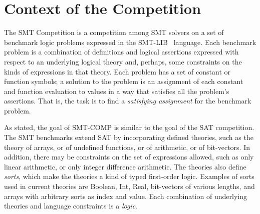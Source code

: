\documentclass[twoside,11pt]{article}
\begin{document}
\section{Context of the Competition}
\label{sec:context}

The SMT Competition is a competition among SMT solvers on a set of benchmark logic problems expressed in the SMT-LIB~\cite{BarST-RR-10} language. Each benchmark problem is a combination of definitions and logical assertions expressed with respect to an underlying logical theory and, perhaps, some constraints on the kinds of expressions in that theory. Each problem has a set of constant or function symbols; a solution to the problem is an assignment of each constant and function evaluation to values in a way that satisfies all the problem's assertions. That is, the task is to find a \emph{satisfying assignment} for the benchmark problem.

As stated, the goal of SMT-COMP is similar to the goal of the SAT competition. The SMT benchmarks extend SAT by incorporating defined theories, such as the theory of arrays, or of undefined functions, or of arithmetic, or of bit-vectors. In addition, there may be constraints on the set of expressions allowed, such as only linear arithmetic, or only integer difference arithmetic. The theories also define \emph{sorts}, which make the theories a kind of typed first-order logic. Examples of sorts used in current theories are Boolean, Int, Real, bit-vectors of various lengths, and arrays with arbitrary sorts as index and value. Each combination of underlying theories and language constraints is a \emph{logic}.
\end{document}
